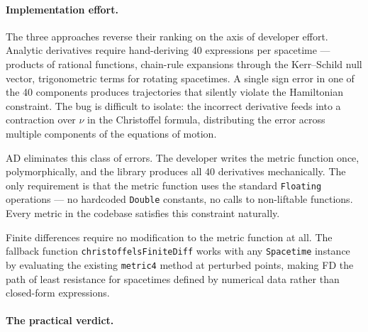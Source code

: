 \paragraph{Implementation effort.}

The three approaches reverse their ranking on the axis of
developer effort.  Analytic derivatives require
hand-deriving 40 expressions per spacetime --- products of
rational functions, chain-rule expansions through the
Kerr--Schild null vector, trigonometric terms for rotating
spacetimes.  A single sign error in one of the 40
components produces trajectories that silently violate the
Hamiltonian constraint.  The bug is difficult to isolate:
the incorrect derivative feeds into a contraction over
$\nu$ in the Christoffel formula, distributing the error
across multiple components of the equations of motion.

AD eliminates this class of errors.  The developer writes
the metric function once, polymorphically, and the library
produces all 40 derivatives mechanically.  The only
requirement is that the metric function uses the standard
\texttt{Floating} operations --- no hardcoded
\texttt{Double} constants, no calls to non-liftable
functions.  Every metric in the codebase satisfies this
constraint naturally.

Finite differences require no modification to the metric
function at all.  The fallback function
\texttt{christoffelsFiniteDiff} works with any
\texttt{Spacetime} instance by evaluating the existing
\texttt{metric4} method at perturbed points, making FD
the path of least resistance for spacetimes defined by
numerical data rather than closed-form expressions.

\paragraph{The practical verdict.}


